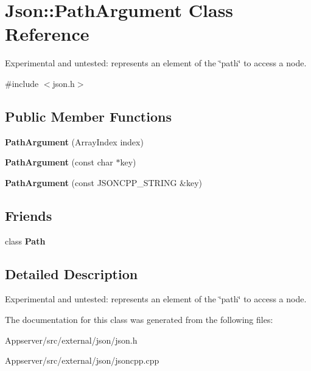 \hypertarget{classJson_1_1PathArgument}{}\section{Json\+:\+:Path\+Argument Class Reference}
\label{classJson_1_1PathArgument}


Experimental and untested\+: represents an element of the \char`\"{}path\char`\"{} to access a node.  




{\ttfamily \#include $<$json.\+h$>$}

\subsection*{Public Member Functions}
\begin{DoxyCompactItemize}
\item 
{\bfseries Path\+Argument} (Array\+Index index)\hypertarget{classJson_1_1PathArgument_a53c5b27143b161301b95fd544c139ecf}{}\label{classJson_1_1PathArgument_a53c5b27143b161301b95fd544c139ecf}

\item 
{\bfseries Path\+Argument} (const char $\ast$key)\hypertarget{classJson_1_1PathArgument_a9690417a8a40e6e49f2acdf6c9281345}{}\label{classJson_1_1PathArgument_a9690417a8a40e6e49f2acdf6c9281345}

\item 
{\bfseries Path\+Argument} (const J\+S\+O\+N\+C\+P\+P\+\_\+\+S\+T\+R\+I\+NG \&key)\hypertarget{classJson_1_1PathArgument_ac15f25452124fbf21218897113015301}{}\label{classJson_1_1PathArgument_ac15f25452124fbf21218897113015301}

\end{DoxyCompactItemize}
\subsection*{Friends}
\begin{DoxyCompactItemize}
\item 
class {\bfseries Path}\hypertarget{classJson_1_1PathArgument_a4877239a6b7f09fbf5a61ca68a49d74c}{}\label{classJson_1_1PathArgument_a4877239a6b7f09fbf5a61ca68a49d74c}

\end{DoxyCompactItemize}


\subsection{Detailed Description}
Experimental and untested\+: represents an element of the \char`\"{}path\char`\"{} to access a node. 

The documentation for this class was generated from the following files\+:\begin{DoxyCompactItemize}
\item 
Appserver/src/external/json/json.\+h\item 
Appserver/src/external/json/jsoncpp.\+cpp\end{DoxyCompactItemize}
